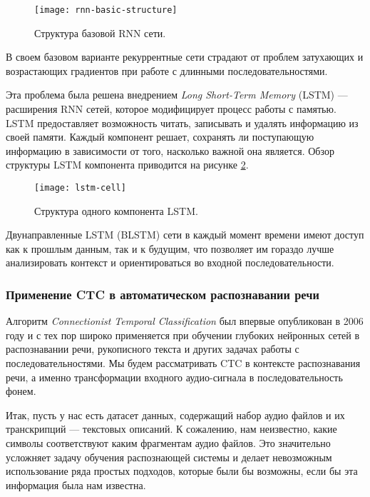\begin{figure}[h]
	\centering
	\texttt{[image: rnn-basic-structure]}
	\caption{Структура базовой RNN сети.}
	\label{fig:rnn-basic-structure}
\end{figure}

В своем базовом варианте рекуррентные сети страдают от проблем затухающих и возрастающих градиентов при работе с длинными последовательностями.

Эта проблема была решена внедрением \emph{Long Short-Term Memory} (LSTM)\cite{hochreiter1997long} --- расширения RNN сетей, которое модифицирует процесс работы с памятью. LSTM предоставляет возможность читать, записывать и удалять информацию из своей памяти. Каждый компонент решает, сохранять ли поступающую информацию в зависимости от того, насколько важной она является. Обзор структуры LSTM компонента приводится на рисунке \ref{fig:lstm-cell}.

\begin{figure}[h]
	\centering
	\texttt{[image: lstm-cell]}
	\caption{Структура одного компонента LSTM.}
	\label{fig:lstm-cell}
\end{figure}

Двунаправленные LSTM (BLSTM) сети\cite{graves2013speech, huang2015bidirectional} в каждый момент времени имеют доступ как к прошлым данным, так и к будущим, что позволяет им гораздо лучше анализировать контекст и ориентироваться во входной последовательности.

\subsubsection{Применение CTC в автоматическом распознавании речи}
Алгоритм \emph{Connectionist Temporal Classification} был впервые опубликован в 2006 году\cite{graves2006connectionist} и с тех пор широко применяется при обучении глубоких нейронных сетей в распознавании речи, рукописного текста и других задачах работы с последовательностями. Мы будем рассматривать CTC в контексте распознавания речи, а именно трансформации входного аудио-сигнала в последовательность фонем.

Итак, пусть у нас есть датасет данных, содержащий набор аудио файлов и их транскрипций --- текстовых описаний. К сожалению, нам неизвестно, какие символы соответствуют каким фрагментам аудио файлов. Это значительно усложняет задачу обучения распознающей системы и делает невозможным использование ряда простых подходов, которые были бы возможны, если бы эта информация была нам известна.

